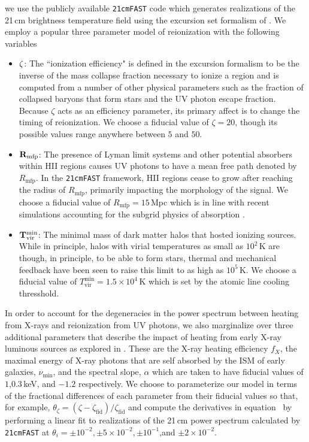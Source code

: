 \documentclass[twocolumn]{emulateapj}
\begin{document}
 we use the publicly available {\tt 21cmFAST} code \citep{Mesinger:2011} which generates realizations of the 21\,cm brightness temperature field using the excursion set formalism of \citet{Furlanetto:2004}. We employ a popular three parameter model of reionization \citep{Mesinger:2012,Pober:2014,Greig:2015,Liu:2015} with the following variables 
\begin{itemize}
\item ${\bf \zeta}$: The ``ionization efficiency" is defined in the \citep{Furlanetto:2004} excursion formalism to be the inverse of the mass collapse fraction necessary to ionize a region and is computed from a number of other physical parameters such as the fraction of collapsed baryons that form stars and the UV photon escape fraction. Because $\zeta$ acts as an efficiency parameter, its primary affect is to change the timing of reionization. We choose a fiducial value of $\zeta=20$, though its possible values range anywhere between $5$ and $50$. 
\item ${\bf R_\text{mfp}}$: The presence of Lyman limit systems and other potential absorbers within HII regions causes UV photons to have a mean free path denoted by $R_\text{mfp}$. In the {\tt 21cmFAST} framework, HII regions cease to grow after reaching the radius of $R_\text{mfp}$, primarily impacting the morphology of the signal. We choose a fiducial value of $R_\text{mfp}=15$\,Mpc which is in line with recent simulations accounting for the subgrid physics of absorption \citep{Sobacchi:2014}. 
\item ${\bf T_\text{vir}^\text{min}}$: The minimal mass of dark matter halos that hosted ionizing sources. While in principle, halos with virial temperatures as small as $10^2$\,K are though, in principle, to be able to form stars, thermal and mechanical feedback have been seen to raise this limit to as high as $10^5$\,K. We choose a fiducial value of $T_\text{vir}^\text{min} = 1.5\times 10^4$\,K which is set by the atomic line cooling thresshold. 
\end{itemize}
In order to account for the degeneracies in the power spectrum between heating from X-rays and reionization from UV photons, we also marginalize over three additional parameters that describe the impact of heating from early X-ray luminous sources as explored in \citep{EwallWice:2015b}. These are the X-ray heating efficiency $f_X$, the maximal energy of X-ray photons that are self absorbed by the ISM of early galaxies, $\nu_\text{min}$, and the spectral slope, $\alpha$ which are taken to have fiducial values of $1$,$0.3$\,keV, and $-1.2$ respectively. We choose to parameterize our model in terms of the fractional differences of each parameter from their fiducial values so that, for example, $\theta_\zeta = (\zeta - \zeta_\text{fid})/\zeta_\text{fid}$ and compute the derivatives in equation~\label{eq:Fisher} by performing a linear fit to realizations of the 21\,cm power spectrum calculated by {\tt 21cmFAST} at $\theta_i= \pm 10^{-2}, \pm 5\times 10^{-2}, \pm 10^{-1}$,and $ \pm 2 \times 10^{-2}$. 
\end{document}
